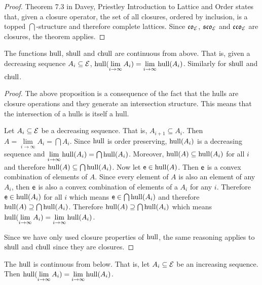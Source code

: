\begin{mathSection}
\begin{proof}
	Theorem 7.3 in Davey, Priestley Introduction to Lattice and Order states that, given a closure operator, the set of all closures, ordered by inclusion, is a topped $\bigcap$-structure and therefore complete lattices. Since $\mathfrak{co}_{\mathcal{E}}$, $\mathfrak{sco}_{\mathcal{E}}$ and $\mathfrak{cco}_{\mathcal{E}}$ are closures, the theorem applies.
\end{proof}


\begin{prop}
	The functions $\mathrm{hull}$, $\mathrm{shull}$ and $\mathrm{chull}$ are continuous from above. That is, given a decreasing sequence $A_i \subseteq \mathcal{E}$, $\mathrm{hull}(\lim\limits_{i \to \infty} A_i) = \lim\limits_{i \to \infty} \mathrm{hull}(A_i)$. Similarly for $\mathrm{shull}$ and $\mathrm{chull}$.
\end{prop}

\begin{proof}
	The above proposition is a consequence of the fact that the hulls are closure operations and they generate an intersection structure. This means that the intersection of a hulls is itself a hull.
	
	Let $A_i \subseteq \mathcal{E}$ be a decreasing sequence. That is, $A_{i+1} \subseteq A_i$. Then $A = \lim\limits_{i \to \infty} A_i = \bigcap A_i$. Since $\mathrm{hull}$ is order preserving, $\mathrm{hull}(A_i)$ is a decreasing sequence and $\lim\limits_{i \to \infty} \mathrm{hull}(A_i) = \bigcap \mathrm{hull}(A_i)$. Moreover, $\mathrm{hull}(A) \subseteq \mathrm{hull}(A_i)$ for all $i$ and therefore $\mathrm{hull}(A) \subseteq \bigcap \mathrm{hull}(A_i)$. Now let $\mathsf{e} \in \mathrm{hull}(A)$. Then $\mathsf{e}$ is a convex combination of elements of $A$. Since every element of $A$ is also an element of any $A_i$, then $\mathsf{e}$ is also a convex combination of elements of a $A_i$ for any $i$. Therefore $\mathsf{e} \in \mathrm{hull}(A_i)$ for all $i$ which means $\mathsf{e} \in \bigcap \mathrm{hull}(A_i)$ and therefore $\mathrm{hull}(A) \supseteq \bigcap \mathrm{hull}(A_i)$. Therefore $\mathrm{hull}(A) \supseteq \bigcap \mathrm{hull}(A_i)$ which means $\mathrm{hull}(\lim\limits_{i \to \infty} A_i) = \lim\limits_{i \to \infty} \mathrm{hull}(A_i)$.
	
	Since we have only used closure properties of $\mathrm{hull}$, the same reasoning applies to $\mathrm{shull}$ and $\mathrm{chull}$ since they are closures.
\end{proof}

\begin{prop}
	The $\mathrm{hull}$ is continuous from below. That is, let $A_i \subseteq \mathcal{E}$ be an increasing sequence. Then $\mathrm{hull}(\lim\limits_{i \to \infty} A_i) = \lim\limits_{i \to \infty} \mathrm{hull}(A_i)$.
\end{prop}


\end{mathSection}
